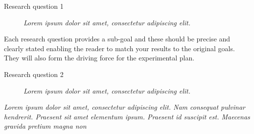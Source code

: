 \begin{description}
\item[Research question 1] {\it Lorem ipsum dolor sit amet, consectetur adipiscing elit.}
\end{description}

Each research question provides a sub-goal and these should be precise and clearly stated enabling the reader to match your results to the original goals. They will also form the driving force for the experimental plan. 

\begin{description}
\item[Research question 2] {\it Lorem ipsum dolor sit amet, consectetur adipiscing elit.}
\end{description}

{\it Lorem ipsum dolor sit amet, consectetur adipiscing elit. Nam consequat pulvinar hendrerit. Praesent sit amet elementum ipsum. Praesent id suscipit est. Maecenas gravida pretium magna non }
\fi
